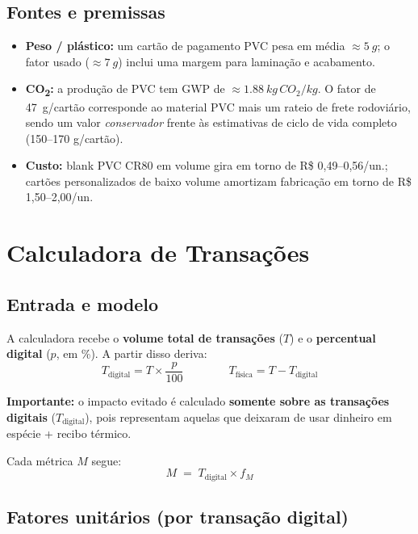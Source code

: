 \documentclass[11pt,a4paper]{article}
\begin{document}
\subsection{Fontes e premissas}
\begin{itemize}[leftmargin=1.4em]
\item \textbf{Peso / plástico:} um cartão de pagamento PVC pesa em média
$\approx \SI{5}{g}$; o fator usado ($\approx \SI{7}{g}$) inclui uma margem para
laminação e acabamento.
\item \textbf{CO\textsubscript{2}:} a produção de PVC tem GWP de
$\approx \SI{1.88}{kg\,CO_2/kg}$. O fator de \SI{47}{g/cartão} corresponde ao
material PVC mais um rateio de frete rodoviário, sendo um valor \emph{conservador}
frente às estimativas de ciclo de vida completo (150--170 g/cartão).
\item \textbf{Custo:} blank PVC CR80 em volume gira em torno de
R\$ 0,49--0,56/un.; cartões personalizados de baixo volume amortizam
fabricação em torno de R\$ 1,50--2,00/un.
\end{itemize}

\section{Calculadora de Transações}

\subsection{Entrada e modelo}

A calculadora recebe o \textbf{volume total de transações} ($T$) e o
\textbf{percentual digital} ($p$, em \%). A partir disso deriva:
\[
T_{\text{digital}} = T \times \frac{p}{100}
\qquad\qquad
T_{\text{física}} = T - T_{\text{digital}}
\]

\begin{notebox}
\textbf{Importante:} o impacto evitado é calculado \textbf{somente sobre as
transações digitais} ($T_{\text{digital}}$), pois representam aquelas que
deixaram de usar dinheiro em espécie + recibo térmico.
\end{notebox}

Cada métrica $M$ segue:
\[
M \;=\; T_{\text{digital}} \times f_M
\]

\subsection{Fatores unitários (por transação digital)}
\end{document}
